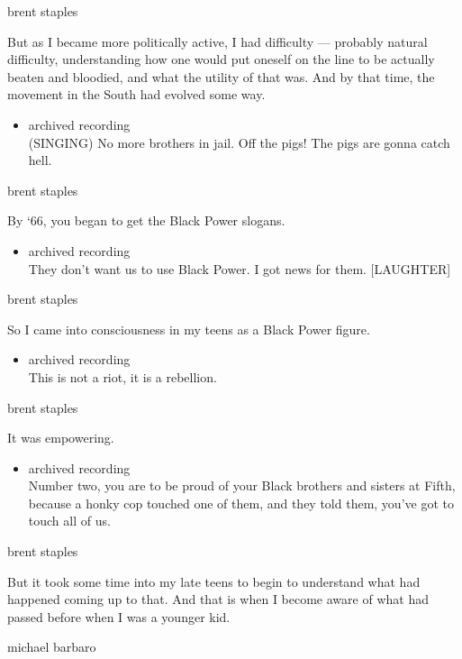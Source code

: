 brent staples

But as I became more politically active, I had difficulty --- probably
natural difficulty, understanding how one would put oneself on the line
to be actually beaten and bloodied, and what the utility of that was.
And by that time, the movement in the South had evolved some way.

\begin{itemize}
\tightlist
\item
  archived recording\\
  (SINGING) No more brothers in jail. Off the pigs! The pigs are gonna
  catch hell.
\end{itemize}

brent staples

By `66, you began to get the Black Power slogans.

\begin{itemize}
\tightlist
\item
  archived recording\\
  They don't want us to use Black Power. I got news for them.
  {[}LAUGHTER{]}
\end{itemize}

brent staples

So I came into consciousness in my teens as a Black Power figure.

\begin{itemize}
\tightlist
\item
  archived recording\\
  This is not a riot, it is a rebellion.
\end{itemize}

brent staples

It was empowering.

\begin{itemize}
\tightlist
\item
  archived recording\\
  Number two, you are to be proud of your Black brothers and sisters at
  Fifth, because a honky cop touched one of them, and they told them,
  you've got to touch all of us.
\end{itemize}

brent staples

But it took some time into my late teens to begin to understand what had
happened coming up to that. And that is when I become aware of what had
passed before when I was a younger kid.

michael barbaro

